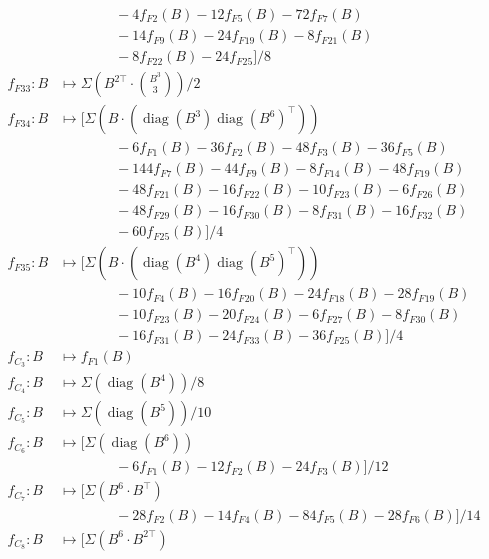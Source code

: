 \documentclass{article}
\theoremstyle{plain}
\DeclareMathOperator{\diag}{diag}
\begin{document}
\begin{align*}
                                &\qquad\qquad-4f_{F2}(B)-12f_{F5}(B)-72f_{F7}(B)\\
                                &\qquad\qquad-14f_{F9}(B)-24f_{F19}(B)-8f_{F21}(B)\\
                                &\qquad\qquad-8f_{F22}(B)-24f_{F25}]/8\\
        f_{F33} : B&\mapsto \Sigma\left(B^{2\top}\cdot \binom{B^3}{3}\right)/2\\
        f_{F34} : B&\mapsto \Big[\Sigma(B\cdot(\diag(B^3)\diag(B^6)^\top))\\
                                &\qquad\qquad-6f_{F1}(B)-36f_{F2}(B)-48f_{F3}(B)-36f_{F5}(B)\\
                                &\qquad\qquad-144f_{F7}(B)-44f_{F9}(B)-8f_{F14}(B)-48f_{F19}(B)\\
                                &\qquad\qquad-48f_{F21}(B)-16f_{F22}(B)-10f_{F23}(B)-6f_{F26}(B)\\
                                &\qquad\qquad-48f_{F29}(B)-16f_{F30}(B)-8f_{F31}(B)-16f_{F32}(B)\\
                                &\qquad\qquad-60f_{F25}(B)\Big]/4\\
        f_{F35} : B&\mapsto \Big[\Sigma(B\cdot (\diag(B^4)\diag(B^5)^\top))\\
                                &\qquad\qquad-10f_{F4}(B)-16f_{F20}(B)-24f_{F18}(B)-28f_{F19}(B)\\
                                &\qquad\qquad-10f_{F23}(B)-20f_{F24}(B)-6f_{F27}(B)-8f_{F30}(B)\\
                                &\qquad\qquad-16f_{F31}(B)-24f_{F33}(B)-36f_{F25}(B)\Big]/4\\
        f_{C_3} : B&\mapsto f_{F1}(B)\\
        f_{C_4} : B&\mapsto \Sigma(\diag(B^4))/8\\
        f_{C_5} : B&\mapsto \Sigma(\diag(B^5))/10\\
        f_{C_6} : B&\mapsto [\Sigma(\diag(B^6))\\
                                &\qquad\qquad-6f_{F1}(B)-12f_{F2}(B)-24f_{F3}(B)]/12\\
        f_{C_7} : B&\mapsto [\Sigma(B^6\cdot B^\top)\\
                                &\qquad\qquad-28f_{F2}(B)-14f_{F4}(B)-84f_{F5}(B)-28f_{F6}(B)]/14\\
        f_{C_8} : B&\mapsto [\Sigma(B^6\cdot B^{2\top})\\

\end{align*}
\end{document}
